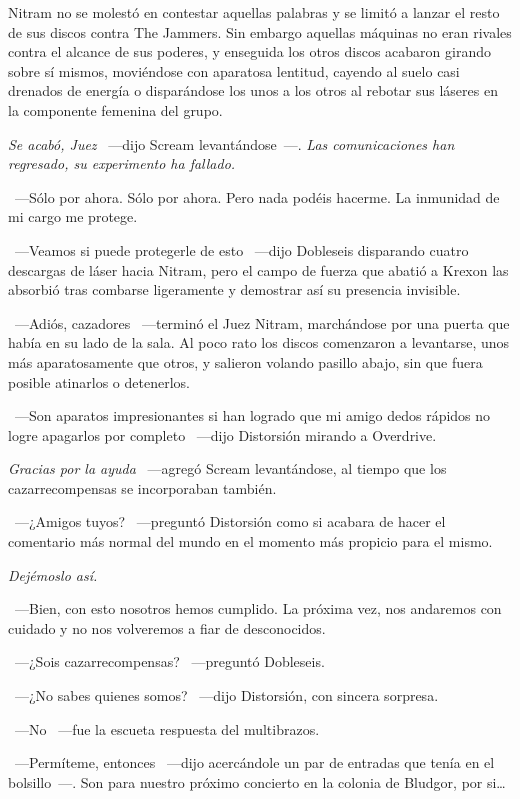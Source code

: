 Nitram no se molestó en contestar aquellas palabras y se limitó a lanzar el resto de sus discos contra The Jammers. Sin embargo aquellas máquinas no eran rivales contra el alcance de sus poderes, y enseguida los otros discos acabaron girando sobre sí mismos, moviéndose con aparatosa lentitud, cayendo al suelo casi drenados de energía o disparándose los unos a los otros al rebotar sus láseres en la componente femenina del grupo.

\emph{Se acabó, Juez} ~---dijo Scream levantándose~---. \emph{Las comunicaciones han regresado, su experimento ha fallado.}

~---Sólo por ahora. Sólo por ahora. Pero nada podéis hacerme. La inmunidad de mi cargo me protege.

~---Veamos si puede protegerle de esto ~---dijo Dobleseis disparando cuatro descargas de láser hacia Nitram, pero el campo de fuerza que abatió a Krexon las absorbió tras combarse ligeramente y demostrar así su presencia invisible.

~---Adiós, cazadores ~---terminó el Juez Nitram, marchándose por una puerta que había en su lado de la sala. Al poco rato los discos comenzaron a levantarse, unos más aparatosamente que otros, y salieron volando pasillo abajo, sin que fuera posible atinarlos o detenerlos.

~---Son aparatos impresionantes si han logrado que mi amigo dedos rápidos no logre apagarlos por completo ~---dijo Distorsión mirando a Overdrive.

\emph{Gracias por la ayuda} ~---agregó Scream levantándose, al tiempo que los cazarrecompensas se incorporaban también.

~---¿Amigos tuyos? ~---preguntó Distorsión como si acabara de hacer el comentario más normal del mundo en el momento más propicio para el mismo.

\emph{Dejémoslo así.}

~---Bien, con esto nosotros hemos cumplido. La próxima vez, nos andaremos con cuidado y no nos volveremos a fiar de desconocidos.

~---¿Sois cazarrecompensas? ~---preguntó Dobleseis.

~---¿No sabes quienes somos? ~---dijo Distorsión, con sincera sorpresa.

~---No ~---fue la escueta respuesta del multibrazos.

~---Permíteme, entonces ~---dijo acercándole un par de entradas que tenía en el bolsillo~---. Son para nuestro próximo concierto en la colonia de Bludgor, por si\dots

